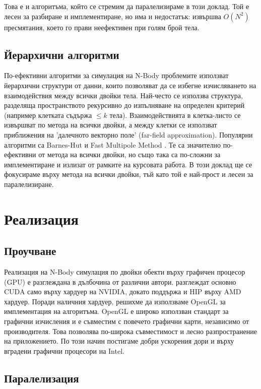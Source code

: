 \documentclass[11pt, a4paper]{article}
\begin{document}
\begin{sloppypar}
Това е и алгоритъма, който се стремим да паралелизираме в този доклад. Той е лесен за разбиране и имплементиране, но има и недостатък: извършва $O(N^2)$ пресмятания, което го прави неефективен при голям брой тела.

\subsection{Йерархични алгоритми}

По-ефективни алгоритми за симулация на N-Body проблемите използват йерархични структури от данни, които позволяват да се избегне изчисляването на взаимодействия между всички двойки тела. Най-често се използва структура, разделяща пространството рекурсивно до изпълняване на определен критерий (например клетката съдържа $\leq k$ тела). Взаимодействията в клетка-листо се извършват по метода на всички двойки, а между клетки се използват приближения на 'далечното векторно поле' (far-field approximation). Популярни алгоритми са Barnes-Hut \cite{barnes1986hierarchical} и Fast Multipole Method \cite{greengard1987fast,dehnen2014fast}. Те са значително по-ефективни от метода на всички двойки, но също така са по-сложни за имплементиране и излизат от рамките на курсовата работа. В този доклад ще се фокусираме върху метода на всички двойки, тъй като той е най-прост и лесен за паралелизиране.

\section{Реализация}

\subsection{Проучване}
Реализация на N-Body симулация по двойки обекти върху графичен процесор (GPU) е разглеждана в дълбочина от различни автори. \cite{burtscher2011efficient,nylons2007fast,belleman2008high} разглеждат основно CUDA само върху хардуер на NVIDIA, докато \cite{Grimm_2022} поддържа и HIP върху AMD хардуер. Поради наличния хардуер, решихме да използваме OpenGL за имплементация на алгоритъма. OpenGL е широко използван стандарт за графични изчисления и е съвместим с повечето графични карти, независимо от производителя. Това позволява по-широка съвместимост и лесно разпространение на приложението. По този начин постигаме добри ускорения дори и върху вградени графични процесори на Intel. 

\subsection{Паралелизация}


\end{sloppypar}
\end{document}
